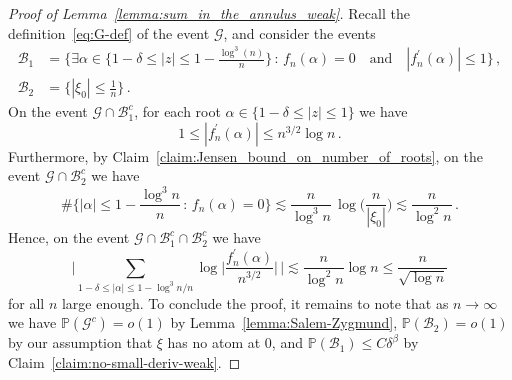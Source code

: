 \documentclass[11pt]{amsart}
\theoremstyle{remark}
\theoremstyle{definition}
\newcommand{\bP}{\mathbb P}
\newcommand{\cB}{\mathcal B}
\newcommand{\cG}{\mathcal G}
\begin{document}
    \begin{proof}[Proof of Lemma~\ref{lemma:sum_in_the_annulus_weak}]
        Recall the definition~\eqref{eq:G-def} of the event $\mathcal{G}$, and consider the events
        \begin{align*}
            \cB_1 &= \Big\{ \exists \alpha \in \Big\{1-\delta \le |z| \le 1 - \frac{\log^3(n)}{n} \Big\}  \, : \, f_n(\alpha)=0 \quad  \text{and} \quad |f_n^\prime(\alpha)|\le 1\Big\} \, , \\ \cB_2 &= \Big\{ |\xi_0| \le \frac{1}{n} \Big\} \, .
        \end{align*}
        On the event $\cG\cap \cB_1^c$, for each root $\alpha\in\{1-\delta\le |z|\le 1\}$ we have
        \[
        1\le |f_n^\prime(\alpha)| \le n^{3/2} \log n \, .
        \]
        Furthermore, by Claim~\ref{claim:Jensen_bound_on_number_of_roots}, on the event $\mathcal{G}\cap \cB_2^c$ we have
        \[
        \# \Big\{ |\alpha|\le 1-\frac{\log^3 n}{n} \, : \, f_n(\alpha) = 0 \Big\} \lesssim \frac{n}{\log^3n} \, \log\Big(\frac{n}{|\xi_0|}\Big) \lesssim \frac{n}{\log^2 n} \, .
        \]
        Hence, on the event $\cG\cap \cB_1^c\cap \cB_2^c$ we have
        \begin{equation*}
            \Bigg| \sum_{1-\delta\le |\alpha|\le 1-\log^3 n /n} \log \bigg|\frac{f_n^\prime(\alpha)}{n^{3/2}}\bigg|\, \Bigg| \lesssim \frac{n}{\log^2 n} \log n \le \frac{n}{\sqrt{\log n}}
        \end{equation*}
        for all $n$ large enough. To conclude the proof, it remains to note that as $n\to\infty$ we have $\bP(\cG^c) = o(1)$ by Lemma~\ref{lemma:Salem-Zygmund}, $\bP(\cB_2) = o(1)$ by our assumption that $\xi$ has no atom at $0$, and $\bP(\cB_1) \le C \delta^\beta$ by Claim~\ref{claim:no-small-deriv-weak}. 
    \end{proof}
    
\end{document}
